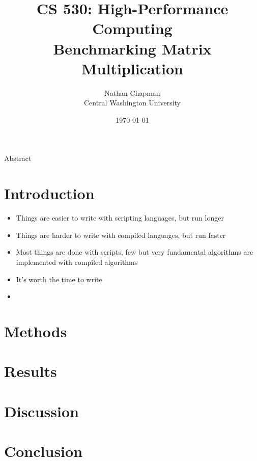\documentclass{article}
\title{\Large \vspace{-0.625in} CS 530: High-Performance Computing \\ Benchmarking Matrix Multiplication \vspace{-0.15in}}
\author{Nathan Chapman \\ {\normalsize Central Washington University}}
\date{\normalsize \vspace{-0.1in}\today}
\begin{document}
\maketitle

    \begin{center}
    Abstract \\
    
    \end{center}

\tableofcontents

\pagebreak

\section{Introduction}

    \begin{itemize}
        \item Things are easier to write with scripting languages, but run longer
        \item Things are harder to write with compiled languages, but run faster
        \item Most things are done with scripts, few but very fundamental algorithms are implemented with compiled algorithms 
        \item It's worth the time to write
        \item 
    \end{itemize}

\section{Methods}

\section{Results}

\section{Discussion}

\section{Conclusion}
\end{document}
